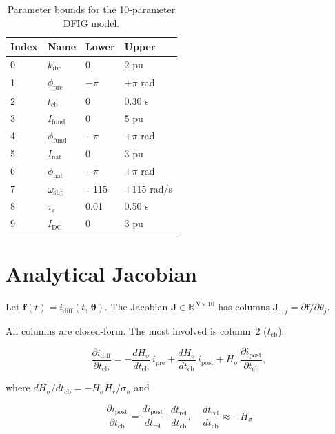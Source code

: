 \documentclass[11pt,a4paper]{article}
\newcommand{\vect}[1]{\boldsymbol{#1}}
\newcommand{\mat}[1]{\mathbf{#1}}
\newcommand{\R}{\mathbb{R}}
\newcommand{\omegas}{\omega_{\text{slip}}}
\newcommand{\taus}{\tau_s}
\newcommand{\tcb}{t_{\text{cb}}}
\newcommand{\Hp}{H_\sigma}
\newcommand{\Hr}{H_r}
\begin{document}
\begin{table}[ht]
  \centering
  \caption{Parameter bounds for the 10-parameter DFIG model.}
  \label{tab:bounds}
  \begin{tabular}{llll}
    \toprule
    Index & Name & Lower & Upper \\
    \midrule
    0 & $k_{\text{ibr}}$  & 0 & 2 pu \\
    1 & $\phi_{\text{pre}}$ & $-\pi$ & $+\pi$ rad \\
    2 & $\tcb$             & 0 & 0.30 s \\
    3 & $I_{\text{fund}}$  & 0 & 5 pu \\
    4 & $\phi_{\text{fund}}$ & $-\pi$ & $+\pi$ rad \\
    5 & $I_{\text{nat}}$   & 0 & 3 pu \\
    6 & $\phi_{\text{nat}}$ & $-\pi$ & $+\pi$ rad \\
    7 & $\omegas$           & $-115$ & $+115$ rad/s \\
    8 & $\taus$             & 0.01 & 0.50 s \\
    9 & $I_{\text{DC}}$    & 0 & 3 pu \\
    \bottomrule
  \end{tabular}
\end{table}

\section{Analytical Jacobian}
\label{sec:jacobian}

Let $\vect{f}(t) = i_{\text{diff}}(t,\,\vect{\theta})$.
The Jacobian $\mat{J}\in\R^{N\times 10}$ has columns
$\mat{J}_{:,j} = \partial\vect{f}/\partial\theta_j$.

All columns are closed-form.  The most involved is column~2 ($\tcb$):

\begin{equation}
  \frac{\partial i_{\text{diff}}}{\partial\tcb}
  = -\frac{d\Hp}{d\tcb}\,i_{\text{pre}}
    + \frac{d\Hp}{d\tcb}\,i_{\text{post}}
    + \Hp\,\frac{\partial i_{\text{post}}}{\partial\tcb},
  \label{eq:jac_tcb}
\end{equation}

where $d\Hp/d\tcb = -\Hp\Hr/\sigma_h$ and

\[
  \frac{\partial i_{\text{post}}}{\partial\tcb}
  = \frac{d i_{\text{post}}}{d t_{\text{rel}}}
    \cdot \frac{d t_{\text{rel}}}{d\tcb}, \quad
  \frac{d t_{\text{rel}}}{d\tcb} \approx -\Hp
\]
\end{document}
